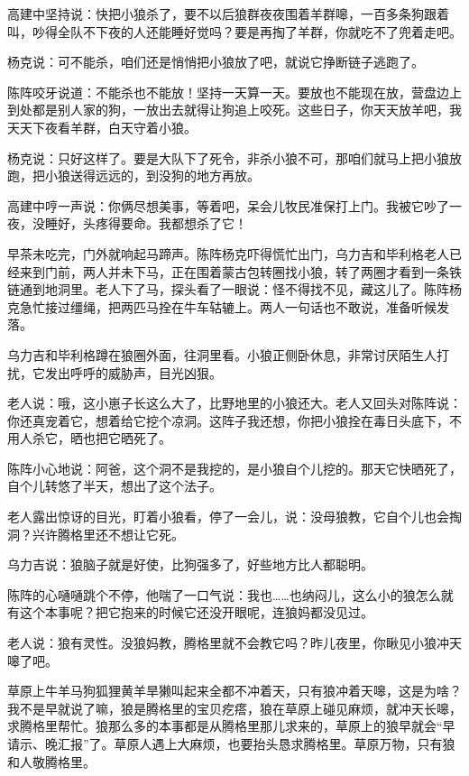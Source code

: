\par 高建中坚持说：快把小狼杀了，要不以后狼群夜夜围着羊群嗥，一百多条狗跟着叫，吵得全队不下夜的人还能睡好觉吗？要是再掏了羊群，你就吃不了兜着走吧。
\par 杨克说：可不能杀，咱们还是悄悄把小狼放了吧，就说它挣断链子逃跑了。
\par 陈阵咬牙说道：不能杀也不能放！坚持一天算一天。要放也不能现在放，营盘边上到处都是别人家的狗，一放出去就得让狗追上咬死。这些日子，你天天放羊吧，我天天下夜看羊群，白天守着小狼。
\par 杨克说：只好这样了。要是大队下了死令，非杀小狼不可，那咱们就马上把小狼放跑，把小狼送得远远的，到没狗的地方再放。
\par 高建中哼一声说：你俩尽想美事，等着吧，呆会儿牧民准保打上门。我被它吵了一夜，没睡好，头疼得要命。我都想杀了它！
\par 
\par 早茶未吃完，门外就响起马蹄声。陈阵杨克吓得慌忙出门，乌力吉和毕利格老人已经来到门前，两人并未下马，正在围着蒙古包转圈找小狼，转了两圈才看到一条铁链通到地洞里。老人下了马，探头看了一眼说：怪不得找不见，藏这儿了。陈阵杨克急忙接过缰绳，把两匹马拴在牛车轱辘上。两人一句话也不敢说，准备听候发落。
\par 乌力吉和毕利格蹲在狼圈外面，往洞里看。小狼正侧卧休息，非常讨厌陌生人打扰，它发出呼呼的威胁声，目光凶狠。
\par 老人说：哦，这小崽子长这么大了，比野地里的小狼还大。老人又回头对陈阵说：你还真宠着它，想着给它挖个凉洞。这阵子我还想，你把小狼拴在毒日头底下，不用人杀它，晒也把它晒死了。
\par 陈阵小心地说：阿爸，这个洞不是我挖的，是小狼自个儿挖的。那天它快晒死了，自个儿转悠了半天，想出了这个法子。
\par 老人露出惊讶的目光，盯着小狼看，停了一会儿，说：没母狼教，它自个儿也会掏洞？兴许腾格里还不想让它死。
\par 乌力吉说：狼脑子就是好使，比狗强多了，好些地方比人都聪明。
\par 陈阵的心嗵嗵跳个不停，他喘了一口气说：我也……也纳闷儿，这么小的狼怎么就有这个本事呢？把它抱来的时候它还没开眼呢，连狼妈都没见过。
\par 老人说：狼有灵性。没狼妈教，腾格里就不会教它吗？昨儿夜里，你瞅见小狼冲天嗥了吧。
\par 草原上牛羊马狗狐狸黄羊旱獭叫起来全都不冲着天，只有狼冲着天嗥，这是为啥？我不是早就说了嘛，狼是腾格里的宝贝疙瘩，狼在草原上碰见麻烦，就冲天长嗥，求腾格里帮忙。狼那么多的本事都是从腾格里那儿求来的，草原上的狼早就会“早请示、晚汇报”了。草原人遇上大麻烦，也要抬头恳求腾格里。草原万物，只有狼和人敬腾格里。
